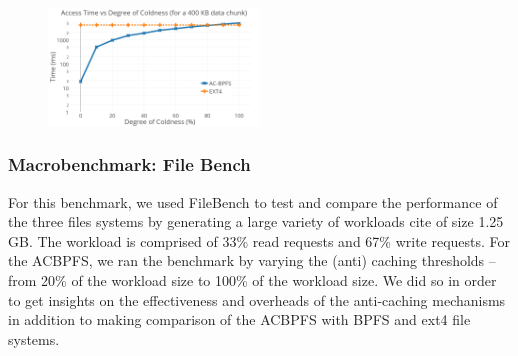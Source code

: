 \begin{figure}
\centering
\vspace{-0.2in}
\includegraphics[width=0.5\textwidth]{figs/coldness.png}
\vspace{-0.2in}
\end{figure}

 
\subsubsection{Macrobenchmark: File Bench}
 For this benchmark, we used FileBench to test and compare the performance of the three files systems by generating a large variety of workloads {cite} of size 1.25 GB. The workload is comprised of 33\% read requests and 67\% write requests. For the AC\-BPFS, we ran the benchmark by varying the (anti) caching thresholds – from 20\% of the workload size to 100\% of the workload size. We did so in order to get insights on the effectiveness and overheads of the anti-caching mechanisms in addition to making comparison of the AC\-BPFS with BPFS and ext4 file systems.


